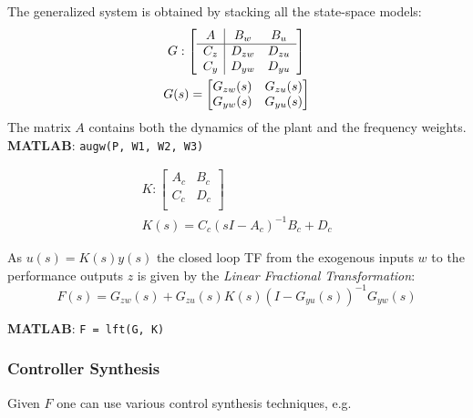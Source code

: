 The generalized system is obtained by stacking all the state-space models:
\begin{gather*}
    G : \left[
        \begin{array}{c|c c} %
            A   & B_w    & B_u    \\
            \hline %
            C_z & D_{zw} & D_{zu} \\
            C_y & D_{yw} & D_{yu}
        \end{array}
        \right]                        \\
    G(s) = \begin{bmatrix}
        G_{zw}(s) & G_{zu}(s) \\
        G_{yw}(s) & G_{yu}(s) \\
    \end{bmatrix}
\end{gather*}
The matrix $A$ contains both the dynamics of the plant and the frequency weights.\\
\textbf{MATLAB}: \texttt{augw(P, W1, W2, W3)}

\newpar{}
\begin{gather*}
    K : \left[
        \begin{array}{c|c} %
            A_c & B_c \\
            \hline %
            C_c & D_c \\
        \end{array}
        \right]                            \\
    K(s) = {C_c(sI-A_c)}^{-1}B_c+D_c
\end{gather*}

As $u(s)=K(s)y(s)$ the closed loop TF from the exogenous inputs $w$ to the performance outputs $z$ is given by the \textit{Linear Fractional Transformation}:
\begin{equation*}
    F(s) = G_{zw}(s) + G_{zu}(s)K(s){(I-G_{yu}(s))}^{-1}G_{yw}(s)
\end{equation*}

\textbf{MATLAB}: \texttt{F = lft(G, K)}

\subsubsection{Controller Synthesis}
Given $F$ one can use various control synthesis techniques, e.g.\
\newpar{}

